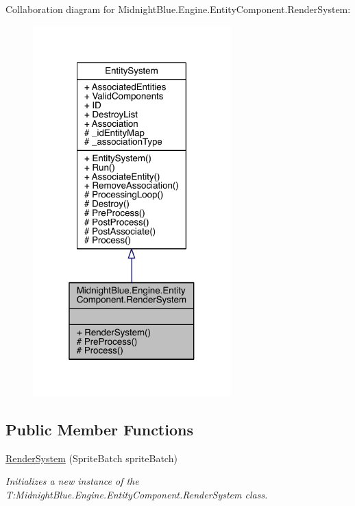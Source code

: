 Collaboration diagram for Midnight\+Blue.\+Engine.\+Entity\+Component.\+Render\+System\+:
\nopagebreak
\begin{figure}[H]
\begin{center}
\leavevmode
\includegraphics[width=217pt]{class_midnight_blue_1_1_engine_1_1_entity_component_1_1_render_system__coll__graph}
\end{center}
\end{figure}
\subsection*{Public Member Functions}
\begin{DoxyCompactItemize}
\item 
\hyperlink{class_midnight_blue_1_1_engine_1_1_entity_component_1_1_render_system_a6783b38f3c1a2c8c6024499862bcc27e}{Render\+System} (Sprite\+Batch sprite\+Batch)
\begin{DoxyCompactList}\small\item\em Initializes a new instance of the T\+:\+Midnight\+Blue.\+Engine.\+Entity\+Component.\+Render\+System class. \end{DoxyCompactList}\end{DoxyCompactItemize}
